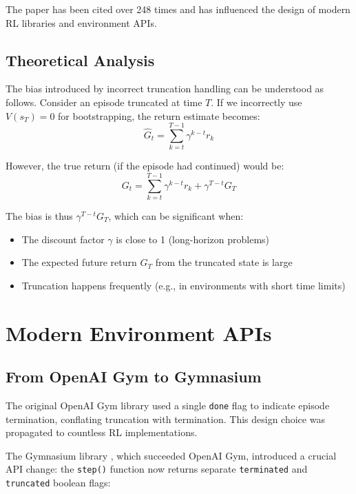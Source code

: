 \documentclass[11pt,a4paper]{article}
\begin{document}
The paper has been cited over 248 times and has influenced the design of modern RL libraries and environment APIs.

\subsection{Theoretical Analysis}

The bias introduced by incorrect truncation handling can be understood as follows. Consider an episode truncated at time $T$. If we incorrectly use $V(s_T) = 0$ for bootstrapping, the return estimate becomes:
\begin{equation}
    \hat{G}_t = \sum_{k=t}^{T-1} \gamma^{k-t} r_k
\end{equation}

However, the true return (if the episode had continued) would be:
\begin{equation}
    G_t = \sum_{k=t}^{T-1} \gamma^{k-t} r_k + \gamma^{T-t} G_T
\end{equation}

The bias is thus $\gamma^{T-t} G_T$, which can be significant when:
\begin{itemize}
    \item The discount factor $\gamma$ is close to 1 (long-horizon problems)
    \item The expected future return $G_T$ from the truncated state is large
    \item Truncation happens frequently (e.g., in environments with short time limits)
\end{itemize}

\section{Modern Environment APIs}

\subsection{From OpenAI Gym to Gymnasium}

The original OpenAI Gym library \citep{brockman2016openai} used a single \texttt{done} flag to indicate episode termination, conflating truncation with termination. This design choice was propagated to countless RL implementations.

The Gymnasium library \citep{towers2024gymnasium}, which succeeded OpenAI Gym, introduced a crucial API change: the \texttt{step()} function now returns separate \texttt{terminated} and \texttt{truncated} boolean flags:
\end{document}
